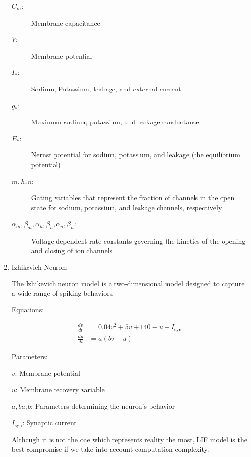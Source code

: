 \documentclass[11pt]{article}
\begin{document}
\begin{enumerate}
        \begin{flushleft}
          \begin{description}
            \item[$C_m$:] Membrane capacitance
            \item[$V$:] Membrane potential
            \item[$I_{\text{*}}$:] Sodium, Potassium, leakage, and external current
            \item[$g_{\text{*}}$:] Maximum sodium, potassium, and leakage conductance
            \item[$E_{\text{*}}$:] Nernst potential for sodium, potassium, and leakage (the equilibrium potential)
            \item[$m, h, n$:] Gating variables that represent the fraction of channels in the open state for sodium, potassium, and leakage channels, respectively
            \item[$\alpha_m, \beta_m, \alpha_h, \beta_h, \alpha_n, \beta_n$:] Voltage-dependent rate constants governing the kinetics of the opening and closing of ion channels
          \end{description}
        \end{flushleft}



  \item Izhikevich Neuron:

        The Izhikevich neuron model is a two-dimensional model designed to capture a wide range of spiking behaviors.

        Equations:

        \begin{align*}
          \frac{dv}{dt} & = 0.04v^2 + 5v + 140 - u + I_{\text{syn}} \\
          \frac{du}{dt} & = a(bv - u)
        \end{align*}


        Parameters:

        $v$: Membrane potential

        $u$: Membrane recovery variable

        $a,ba,b$: Parameters determining the neuron's behavior

        $I_{\text{syn}}$: Synaptic current


        Although it is not the one which represents reality the most, LIF model is the best compromise if we take into account computation complexity.


\end{enumerate}
\end{document}
